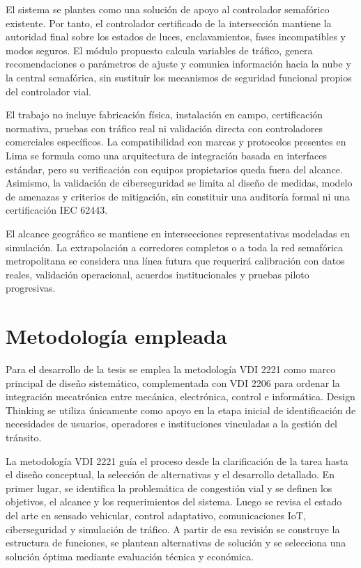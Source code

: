 \documentclass[12pt,a4paper,oneside]{report}
\begin{document}
El sistema se plantea como una solución de apoyo al controlador semafórico existente. Por tanto, el controlador certificado de la intersección mantiene la autoridad final sobre los estados de luces, enclavamientos, fases incompatibles y modos seguros. El módulo propuesto calcula variables de tráfico, genera recomendaciones o parámetros de ajuste y comunica información hacia la nube y la central semafórica, sin sustituir los mecanismos de seguridad funcional propios del controlador vial.

El trabajo no incluye fabricación física, instalación en campo, certificación normativa, pruebas con tráfico real ni validación directa con controladores comerciales específicos. La compatibilidad con marcas y protocolos presentes en Lima se formula como una arquitectura de integración basada en interfaces estándar, pero su verificación con equipos propietarios queda fuera del alcance. Asimismo, la validación de ciberseguridad se limita al diseño de medidas, modelo de amenazas y criterios de mitigación, sin constituir una auditoría formal ni una certificación IEC 62443.

El alcance geográfico se mantiene en intersecciones representativas modeladas en simulación. La extrapolación a corredores completos o a toda la red semafórica metropolitana se considera una línea futura que requerirá calibración con datos reales, validación operacional, acuerdos institucionales y pruebas piloto progresivas.

\section{Metodología empleada}\label{metodologuxeda-empleada}

Para el desarrollo de la tesis se emplea la metodología VDI 2221 como marco principal de diseño sistemático, complementada con VDI 2206 para ordenar la integración mecatrónica entre mecánica, electrónica, control e informática. Design Thinking se utiliza únicamente como apoyo en la etapa inicial de identificación de necesidades de usuarios, operadores e instituciones vinculadas a la gestión del tránsito.

La metodología VDI 2221 guía el proceso desde la clarificación de la tarea hasta el diseño conceptual, la selección de alternativas y el desarrollo detallado. En primer lugar, se identifica la problemática de congestión vial y se definen los objetivos, el alcance y los requerimientos del sistema. Luego se revisa el estado del arte en sensado vehicular, control adaptativo, comunicaciones IoT, ciberseguridad y simulación de tráfico. A partir de esa revisión se construye la estructura de funciones, se plantean alternativas de solución y se selecciona una solución óptima mediante evaluación técnica y económica.
\end{document}
